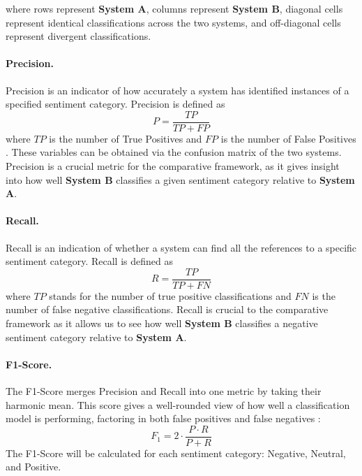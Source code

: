 \documentclass[12pt,a4paper]{report}
\newcommand{\sysA}{\textbf{System A}}
\newcommand{\sysB}{\textbf{System B}}
\begin{document}
\noindent where rows represent \sysA, columns represent \sysB, diagonal cells
represent identical classifications across the two systems, and off-diagonal
cells represent divergent classifications.

\paragraph{Precision.} Precision is an indicator of how accurately a system has
identified instances of a specified sentiment category. Precision is defined as
\begin{equation}
  P = \frac{TP}{TP + FP}
  \label{eq:precision}
\end{equation}
where $TP$ is the number of True Positives and $FP$ is the number of False
Positives \parencite{googledevnd}. These variables can be obtained via the confusion
matrix of the two systems. Precision is a crucial metric for the comparative
framework, as it gives insight into how well \sysB{} classifies a given
sentiment category relative to \sysA.

\paragraph{Recall.} Recall is an indication of whether a system can find all
the references to a specific sentiment category. Recall is defined as
\begin{equation}
  R = \frac{TP}{TP + FN}
  \label{eq:recall}
\end{equation}
where $TP$ stands for the number of true positive classifications and $FN$ is
the number of false negative classifications. Recall is crucial to the
comparative framework as it allows us to see how well \sysB{} classifies a
negative sentiment category relative to \sysA.

\paragraph{F1-Score.} The F1-Score merges Precision and Recall into one metric
by taking their harmonic mean. This score gives a well-rounded view of how well
a classification model is performing, factoring in both false positives and
false negatives \parencite{sklearnnd}:
\begin{equation}
  F_1 = 2 \cdot \frac{P \cdot R}{P + R}
  \label{eq:f1}
\end{equation}
The F1-Score will be calculated for each sentiment category: Negative, Neutral,
and Positive.
\end{document}
